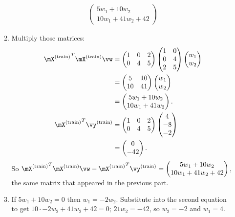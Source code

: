 \documentclass{article}
\newcommand{\utrain}{^{\textnormal{(train)}}}
\begin{document}
\begin{enumerate}
\begin{enumerate}
\begin{align*}
\begin{pmatrix}
                                            5w_1 + 10w_2 \\ 
                                            10w_1 + 41w_2 + 42                       
                                            \end{pmatrix}
     \end{align*}
    \item Multiply those matrices: 
        \begin{align*}
            {\mX\utrain}^T\mX\utrain\vw & = 
            \begin{pmatrix}1&0&2\\0&4&5\end{pmatrix}
            \begin{pmatrix}1&0\\0&4\\2&5\end{pmatrix}
            \begin{pmatrix}w_1\\w_2\end{pmatrix} \\
                                      & = 
            \begin{pmatrix}5&10\\10&41\end{pmatrix}
            \begin{pmatrix}w_1\\w_2\end{pmatrix} \\
                                      & = 
             \begin{pmatrix}5w_1+10w_2\\10w_1+41w_2\end{pmatrix}. \\
            {\mX\utrain}^T\vy\utrain    & =
            \begin{pmatrix}1&0&2\\0&4&5\end{pmatrix}
            \begin{pmatrix}4\\-8\\-2\end{pmatrix} \\
                                      & = 
            \begin{pmatrix}0\\-42\end{pmatrix}. \\
        \end{align*}
        So ${\mX\utrain}^T\mX\utrain\vw - {\mX\utrain}^T\vy\utrain =
        \begin{pmatrix}
            5w_1 + 10w_2 \\ 
            10w_1 + 41w_2 + 42
            \end{pmatrix}$, the same matrix that appeared in the previous part.
    \item If $5w_1 + 10w_2 = 0$ then $w_1 = -2w_2$. Substitute into the second equation to get $10\cdot-2w_2 + 41w_2 + 42 = 0$; $21w_2 = -42$, so $w_2 = -2$ and $w_1 = 4$.
    

\end{enumerate}
\end{enumerate}
\end{document}
